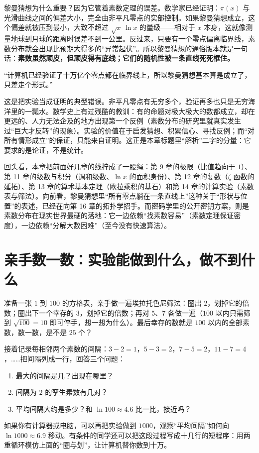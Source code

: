 黎曼猜想为什么重要？因为它管着素数定理的误差。数学家已经证明：$\pi(x)$ 与光滑曲线之间的偏差大小，完全由非平凡零点的实部控制。如果黎曼猜想成立，这个偏差就被压到最小，大致不超过 $\sqrt{x}\,\ln x$ 的量级——相对于 $x$ 本身，这就像测量地球到月球的距离时误差不到一公里。反过来，只要有一个零点偏离临界线，素数分布就会出现比预期大得多的“异常起伏”。所以黎曼猜想的通俗版本就是一句话：\textbf{素数虽然顽皮，但顽皮得有底线；它们的随机性被一条直线死死框住。}

\begin{fanli}
“计算机已经验证了十万亿个零点都在临界线上，所以黎曼猜想基本算是成立了，只差走个形式。”

这是把实验当成证明的典型错误。非平凡零点有无穷多个，验证再多也只是无穷海洋里的一瓢水。数学史上有过残酷的教训：有的命题对极大极大的数都成立，却在更远的、人力无法企及的地方出现第一个反例（素数分布的研究里就真实发生过“巨大才反转”的现象）。实验的价值在于启发猜想、积累信心、寻找反例；而“对所有情形成立”的保证，只能来自证明。这正是本章标题里“解析”二字的分量：它要求的是论证，不是统计。
\end{fanli}

\begin{lianjie}
回头看，本章把前面好几章的线拧成了一股绳：第 9 章的极限（比值趋向于 $1$）、第 11 章的级数与积分（调和级数、$\ln x$ 的面积身份）、第 12 章的复数（$\zeta$ 函数的延拓）、第 13 章的算术基本定理（欧拉乘积的基石）和第 14 章的计算实验（素数表与筛法）。向前看，黎曼猜想里“所有零点躺在一条直线上”这种关于“形状与位置”的表述，已经在向第 16 章的拓扑学招手。而密码学里的公开密钥方案，则是素数分布在现实世界最硬的落地：它一边依赖“找素数容易”（素数定理保证密度），一边依赖“分解大数困难”（至今没有快速算法）。
\end{lianjie}

\section{亲手数一数：实验能做到什么，做不到什么}

\begin{shiyan}
准备一张 $1$ 到 $100$ 的方格表，亲手做一遍埃拉托色尼筛法：圈出 $2$，划掉它的倍数；圈出下一个幸存的 $3$，划掉它的倍数；再对 $5$、$7$ 各做一遍（$100$ 以内只需筛到 $\sqrt{100}=10$ 即可停手，想一想为什么）。最后幸存的数就是 $100$ 以内的全部素数，数一数，是不是 $25$ 个？

接着记录每相邻两个素数的间隔：$3-2=1$，$5-3=2$，$7-5=2$，$11-7=4$，……把间隔列成一行，回答三个问题：
\begin{enumerate}
  \item 最大的间隔是几？出现在哪里？
  \item 间隔为 $2$ 的孪生素数有几对？
  \item 平均间隔大约是多少？和 $\ln 100\approx 4.6$ 比一比，接近吗？
\end{enumerate}
如果你有计算器或电脑，可以再把实验做到 $1000$，观察“平均间隔”如何向 $\ln 1000\approx 6.9$ 移动。有条件的同学还可以把这段过程写成十几行的短程序：用两重循环模仿上面的“圈与划”，让计算机替你数到十万。
\end{shiyan}

